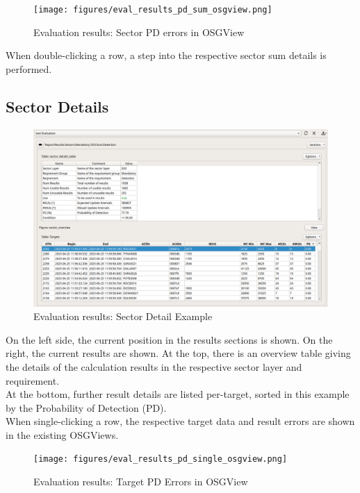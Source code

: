 \begin{figure}[H]
  \hspace*{-2.5cm}
    \texttt{[image: figures/eval\_results\_pd\_sum\_osgview.png]}
  \caption{Evaluation results: Sector PD errors in OSGView}
\end{figure}

When double-clicking a row, a step into the respective sector sum details is performed.

\subsection{Sector Details}

\begin{figure}[H]
  \hspace*{-2cm}
    \includegraphics[width=18cm,frame]{figures/eval_results_sec_det_example.png}
  \caption{Evaluation results: Sector Detail Example}
\end{figure}

On the left side, the current position in the results sections is shown. On the right, the current results are shown. At the top, there is an overview table giving the details of the calculation results in the respective sector layer and requirement. \\

At the bottom, further result details are listed per-target, sorted in this example by the Probability of Detection (PD). \\

When single-clicking a row, the respective target data and result errors are shown in the existing OSGViews.

\begin{figure}[H]
  \hspace*{-2.5cm}
    \texttt{[image: figures/eval\_results\_pd\_single\_osgview.png]}
  \caption{Evaluation results: Target PD Errors in OSGView}
\end{figure}

